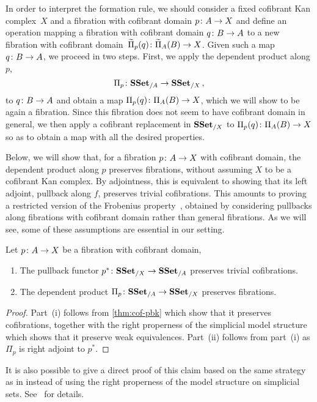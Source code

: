 \documentclass[reqno,10pt,a4paper,oneside,draft]{amsart}
\begin{document}
In order to interpret the formation rule, we should consider a fixed cofibrant Kan complex~$X$ and a fibration with cofibrant domain $p \colon A \to X$  and define an operation mapping a fibration with cofibrant domain $q \colon B \to A$  to a new fibration with cofibrant domain~$\widetilde{\Pi}_p(q) \colon \widetilde{\Pi}_A(B) \to X$. Given such a map $q \colon B \to A$, we proceed
in two steps. First, we apply the dependent product along $p$, 
\[
\Pi_p \colon \mathbf{SSet}_{/A} \to \mathbf{SSet}_{/X} \, , 
\]
to $q \colon B \to A$ and obtain a map $\Pi_p(q) \colon \Pi_A(B) \to X$, which we will show to be again a fibration. Since this fibration does not seem to have  cofibrant domain in general, we then apply a
cofibrant replacement in $\mathbf{SSet}_{/X}$ to $\Pi_p(q) \colon \Pi_A(B) \to X$ so as to obtain a map with all the desired
properties. 

Below, we will show that, for a fibration $p \colon A \rightarrow X$ with cofibrant domain, the dependent product along $p$ preserves fibrations, without assuming $X$ to be a cofibrant Kan complex. By adjointness, this is equivalent to showing that its left adjoint, \ie 
 pullback along $f$, preserves trivial cofibrations. This amounts to proving a restricted version of the Frobenius property~\cite{BergB:topsmi}, obtained by considering pullbacks along fibrations with
cofibrant domain rather than general fibrations. As we will see, some of these assumptions are essential in our
setting.  


\begin{theorem}\label{cor:Pi_types_are_fibrant}
Let $p \colon A \rightarrow X$ be a fibration with cofibrant domain,
\begin{enumerate}[$(i)$]
\item The pullback functor $p^* \colon \mathbf{SSet}_{/X} \to \mathbf{SSet}_{/A}$ preserves trivial cofibrations.
\item The dependent product $\Pi_p \colon \mathbf{SSet}_{/A} \to \mathbf{SSet}_{/X}$ preserves  fibrations.
\end{enumerate}
\end{theorem}

\begin{proof} Part~(i) follows from \cref{thm:cof-pbk} which show that it preserves cofibrations, together with the right properness of the simplicial model structure which shows that it preserve weak equivalences.
 Part~(ii) follows from part~(i) as $\Pi_p$ is right adjoint to $p^*$.
\end{proof}


It is also possible to give a direct proof of this claim based on the same strategy as in \cite{gambino2017frobenius} instead of using the right properness of the model structure on simplicial sets. See~\cite{GambinoN:anocp} for details.
\end{document}
